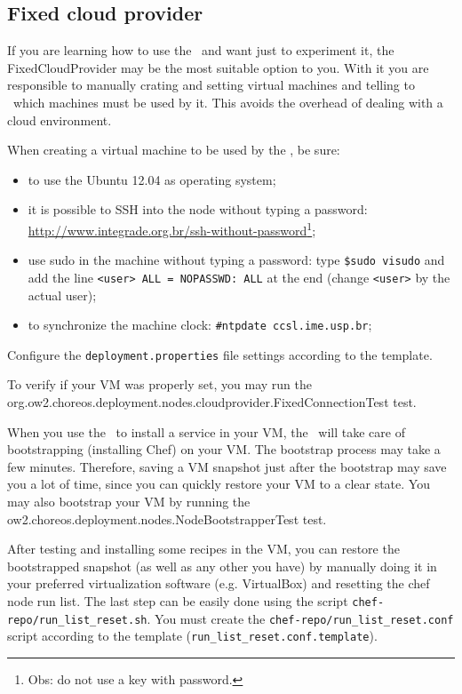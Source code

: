 \subsection{Fixed cloud provider}

If you are learning how to use the \ee\ and want just to experiment it, the \textsf{FixedCloudProvider} may be the most suitable option to you. With it you are responsible to manually crating and setting virtual machines and telling to \ee\ which machines must be used by it. This avoids the overhead of dealing with a cloud environment. 

When creating a virtual machine to be used by the \ee, be sure:
\begin{itemize}
\item to use the Ubuntu 12.04 as operating system;
\item it is possible to SSH into the node without typing a password: \url{http://www.integrade.org.br/ssh-without-password}\footnote{Obs: do not use a key with password.};
\item use sudo in the machine without typing a password: type \texttt{\$sudo visudo} and add the line \texttt{<user> ALL = NOPASSWD: ALL} at the end (change \texttt{<user>} by the actual user);
\item to synchronize the machine clock: \texttt{\#ntpdate ccsl.ime.usp.br};
\end{itemize}

Configure the \texttt{deployment.properties} file settings according to the template.

To verify if your VM was properly set, you may run the \\ \textsf{org.ow2.choreos.deployment.nodes.cloudprovider.FixedConnectionTest} test.

When you use the \ee\ to install a service in your VM, the \ee\ will take care of bootstrapping (installing Chef) on your VM. The bootstrap process may take a few minutes. Therefore, saving a VM snapshot just after the bootstrap may save you a lot of time, since you can quickly restore your VM to a clear state. You may also bootstrap your VM by running the \textsf{ow2.choreos.deployment.nodes.NodeBootstrapperTest} test.

After testing and installing some recipes in the VM, you can restore the bootstrapped snapshot (as well as any other you have) by manually doing it in your preferred virtualization software (e.g. VirtualBox) and resetting the chef node run list. The last step can be easily done using the script \texttt{chef-repo/run\_list\_reset.sh}. You must create the \texttt{chef-repo/run\_list\_reset.conf} script according to the template (\texttt{run\_list\_reset.conf.template}).

